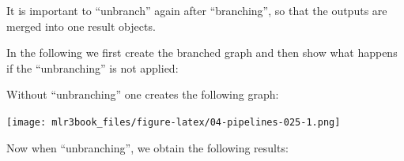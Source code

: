 \documentclass[]{article}
\newenvironment{Shaded}{}{}
\newcommand{\CommentTok}[1]{\textcolor[rgb]{0.00,0.50,0.00}{#1}}
\newcommand{\DataTypeTok}[1]{#1}
\newcommand{\KeywordTok}[1]{\textcolor[rgb]{0.00,0.00,1.00}{#1}}
\newcommand{\NormalTok}[1]{#1}
\newcommand{\OperatorTok}[1]{#1}
\newcommand{\OtherTok}[1]{\textcolor[rgb]{1.00,0.25,0.00}{#1}}
\newcommand{\StringTok}[1]{\textcolor[rgb]{0.00,0.50,0.50}{#1}}
\renewenvironment{Shaded} {\begin{snugshade}\small} {\end{snugshade}}
\begin{document}
It is important to ``unbranch'' again after ``branching'', so that the outputs are merged into one result objects.

In the following we first create the branched graph and then show what happens if the ``unbranching'' is not applied:

\begin{Shaded}
\end{Shaded}

Without ``unbranching'' one creates the following graph:

\begin{Shaded}
\end{Shaded}

\texttt{[image: mlr3book\_files/figure-latex/04-pipelines-025-1.png]}

Now when ``unbranching'', we obtain the following results:

\begin{Shaded}
\end{Shaded}
\end{document}
